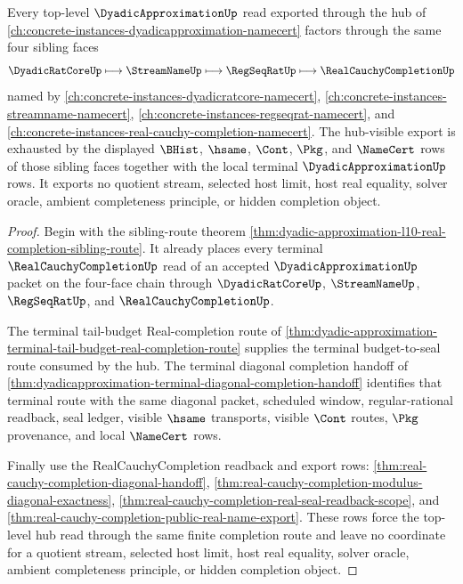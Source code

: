 \begin{theorem}
\label{thm:dyadic-approximation-top-hub-l10-sibling-route}
Every top-level $\DyadicApproximationUp$ read exported through the hub of \autoref{ch:concrete-instances-dyadicapproximation-namecert} factors through the same four sibling faces
$$
\DyadicRatCoreUp \longmapsto \StreamNameUp \longmapsto \RegSeqRatUp \longmapsto \RealCauchyCompletionUp
$$
named by \autoref{ch:concrete-instances-dyadicratcore-namecert}, \autoref{ch:concrete-instances-streamname-namecert}, \autoref{ch:concrete-instances-regseqrat-namecert}, and \autoref{ch:concrete-instances-real-cauchy-completion-namecert}. The hub-visible export is exhausted by the displayed $\BHist$, $\hsame$, $\Cont$, $\Pkg$, and $\NameCert$ rows of those sibling faces together with the local terminal $\DyadicApproximationUp$ rows. It exports no quotient stream, selected host limit, host real equality, solver oracle, ambient completeness principle, or hidden completion object.
\end{theorem}
\begin{proof}
Begin with the sibling-route theorem \autoref{thm:dyadic-approximation-l10-real-completion-sibling-route}. It already places every terminal $\RealCauchyCompletionUp$ read of an accepted $\DyadicApproximationUp$ packet on the four-face chain through $\DyadicRatCoreUp$, $\StreamNameUp$, $\RegSeqRatUp$, and $\RealCauchyCompletionUp$.

The terminal tail-budget Real-completion route of \autoref{thm:dyadic-approximation-terminal-tail-budget-real-completion-route} supplies the terminal budget-to-seal route consumed by the hub. The terminal diagonal completion handoff of \autoref{thm:dyadicapproximation-terminal-diagonal-completion-handoff} identifies that terminal route with the same diagonal packet, scheduled window, regular-rational readback, seal ledger, visible $\hsame$ transports, visible $\Cont$ routes, $\Pkg$ provenance, and local $\NameCert$ rows.

Finally use the RealCauchyCompletion readback and export rows: \autoref{thm:real-cauchy-completion-diagonal-handoff}, \autoref{thm:real-cauchy-completion-modulus-diagonal-exactness}, \autoref{thm:real-cauchy-completion-real-seal-readback-scope}, and \autoref{thm:real-cauchy-completion-public-real-name-export}. These rows force the top-level hub read through the same finite completion route and leave no coordinate for a quotient stream, selected host limit, host real equality, solver oracle, ambient completeness principle, or hidden completion object.
\end{proof}

